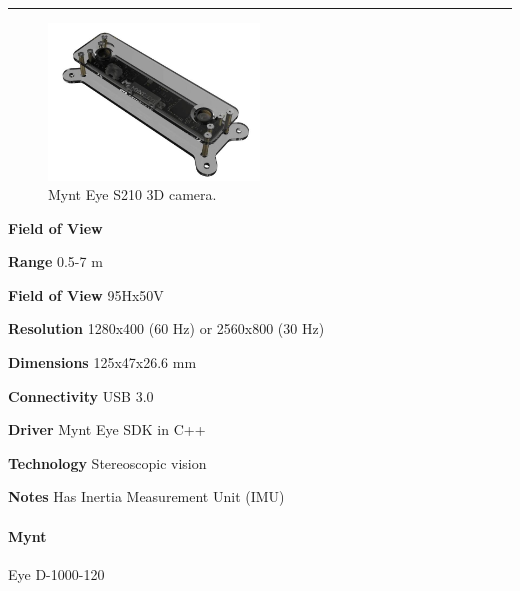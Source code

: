 \documentclass[../main.tex]{subfiles}
\begin{document}
\noindent\rule{8cm}{0.1pt}
\begin{figure}[H]
    \centering
    \includegraphics[width=0.5\textwidth]{images/MinteyeS210.png}
    \caption{Mynt Eye S210 3D camera.}
    \label{fig:MinteyeS210}
\end{figure}
\begin{labeling}{\textbf{Field of View    }}
    \setlength{\itemindent}{2em}
    \item [\textbf{Range}] 0.5-7 m
    \item [\textbf{Field of View}] 95Hx50V
    \item [\textbf{Resolution}] 1280x400 (60 Hz) or 2560x800 (30 Hz)
    \item [\textbf{Dimensions}] 125x47x26.6 mm 
    \item [\textbf{Connectivity}] USB 3.0
    \item [\textbf{Driver}] Mynt Eye SDK in C++
    \item [\textbf{Technology}] Stereoscopic vision
    \item [\textbf{Notes}] Has Inertia Measurement Unit (IMU)
\end{labeling}
\vspace{1em}
\paragraph{\large \textbf{Mynt}} {\large Eye D-1000-120}
\end{document}
